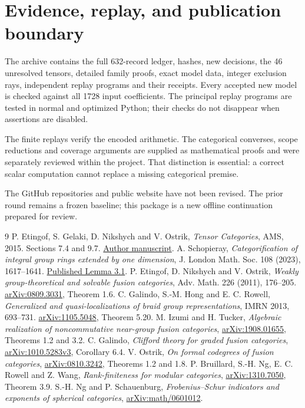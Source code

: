 \documentclass[11pt]{article}
\begin{document}
\section{Evidence, replay, and publication boundary}
The archive contains the full 632-record ledger, hashes, new decisions,
the 46 unresolved tensors, detailed family proofs, exact model data,
integer exclusion rays, independent replay programs and their receipts.
Every accepted new model is checked against all 1728 input coefficients.
The principal replay programs are tested in normal and optimized Python;
their checks do not disappear when assertions are disabled.

The finite replays verify the encoded arithmetic. The categorical
converses, scope reductions and coverage arguments are supplied as
mathematical proofs and were separately reviewed within the project.
That distinction is essential: a correct scalar computation cannot
replace a missing categorical premise.

The GitHub repositories and public website have not been revised. The
prior round remains a frozen baseline; this package is a new offline
continuation prepared for review.

\clearpage
\begin{thebibliography}{9}
 P. Etingof, S. Gelaki, D. Nikshych and V. Ostrik,
\emph{Tensor Categories}, AMS, 2015. Sections 7.4 and 9.7.
\href{https://math.mit.edu/~etingof/egnobookfinal.pdf}{Author manuscript}.
 A. Schopieray, \emph{Categorification of integral group rings
extended by one dimension}, J. London Math. Soc. 108 (2023), 1617--1641.
\href{https://doi.org/10.1112/jlms.12789}{Published Lemma 3.1}.
 P. Etingof, D. Nikshych and V. Ostrik,
\emph{Weakly group-theoretical and solvable fusion categories},
Adv. Math. 226 (2011), 176--205.
\href{https://arxiv.org/abs/0809.3031}{arXiv:0809.3031}, Theorem 1.6.
 C. Galindo, S.-M. Hong and E. C. Rowell,
\emph{Generalized and quasi-localizations of braid group representations},
IMRN 2013, 693--731.
\href{https://arxiv.org/abs/1105.5048}{arXiv:1105.5048}, Theorem 5.20.
 M. Izumi and H. Tucker,
\emph{Algebraic realization of noncommutative near-group fusion categories},
\href{https://arxiv.org/abs/1908.01655}{arXiv:1908.01655},
Theorems 1.2 and 3.2.
 C. Galindo, \emph{Clifford theory for graded fusion categories},
\href{https://arxiv.org/abs/1010.5283}{arXiv:1010.5283v3}, Corollary 6.4.
 V. Ostrik, \emph{On formal codegrees of fusion categories},
\href{https://arxiv.org/abs/0810.3242}{arXiv:0810.3242}, Theorems 1.2 and 1.8.
 P. Bruillard, S.-H. Ng, E. C. Rowell and Z. Wang,
\emph{Rank-finiteness for modular categories},
\href{https://arxiv.org/abs/1310.7050}{arXiv:1310.7050}, Theorem 3.9.
 S.-H. Ng and P. Schauenburg,
\emph{Frobenius--Schur indicators and exponents of spherical categories},
\href{https://arxiv.org/abs/math/0601012}{arXiv:math/0601012}.
\end{thebibliography}
\end{document}
